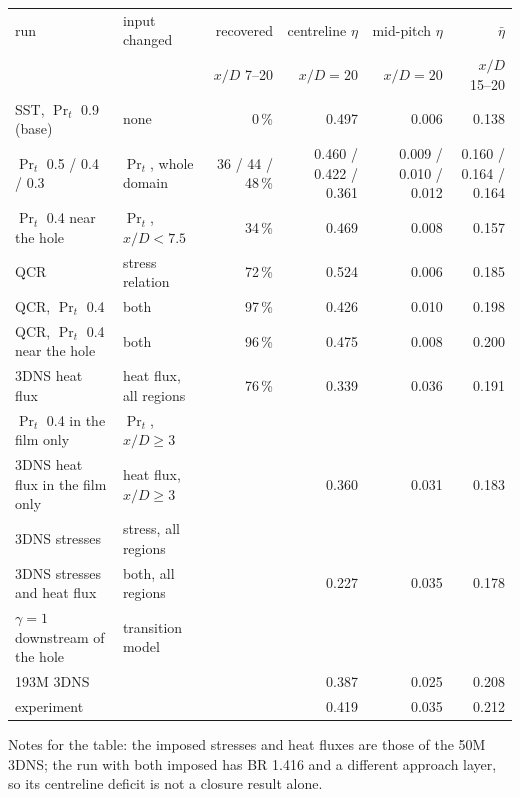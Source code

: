 \documentclass[10pt]{article}
\begin{document}
{\centering\footnotesize
\begin{tabular}{@{}l l r r r r@{}}
\toprule
run & input changed & recovered & centreline $\eta$ & mid-pitch $\eta$ & $\bar\eta$ \\
 & & $x/D$ 7--20 & $x/D=20$ & $x/D=20$ & $x/D$ 15--20 \\
\midrule
SST, $\Pr_t$ 0.9 (base) & none & 0\,\% & 0.497 & 0.006 & 0.138 \\
$\Pr_t$ 0.5 / 0.4 / 0.3 & $\Pr_t$, whole domain & 36 / 44 / 48\,\% & 0.460 / 0.422 / 0.361 & 0.009 / 0.010 / 0.012 & 0.160 / 0.164 / 0.164 \\
$\Pr_t$ 0.4 near the hole & $\Pr_t$, $x/D<7.5$ & 34\,\% & 0.469 & 0.008 & 0.157 \\
QCR & stress relation & 72\,\% & 0.524 & 0.006 & 0.185 \\
QCR, $\Pr_t$ 0.4 & both & 97\,\% & 0.426 & 0.010 & 0.198 \\
QCR, $\Pr_t$ 0.4 near the hole & both & 96\,\% & 0.475 & 0.008 & 0.200 \\
3DNS heat flux & heat flux, all regions & 76\,\% & 0.339 & 0.036 & 0.191 \\
$\Pr_t$ 0.4 in the film only & $\Pr_t$, $x/D\ge3$ & & & & \\
3DNS heat flux in the film only & heat flux, $x/D\ge3$ & & 0.360 & 0.031 & 0.183 \\
3DNS stresses & stress, all regions & & & & \\
3DNS stresses and heat flux & both, all regions & & 0.227 & 0.035 & 0.178 \\
$\gamma=1$ downstream of the hole & transition model & & & & \\
\midrule
193M 3DNS & & & 0.387 & 0.025 & 0.208 \\
experiment & & & 0.419 & 0.035 & 0.212 \\
\bottomrule
\end{tabular}\par}
Notes for the table: the imposed stresses and heat fluxes are those of the 50M 3DNS; the run with both imposed
has BR 1.416 and a different approach layer, so its centreline deficit is not a closure result alone.
\end{document}
